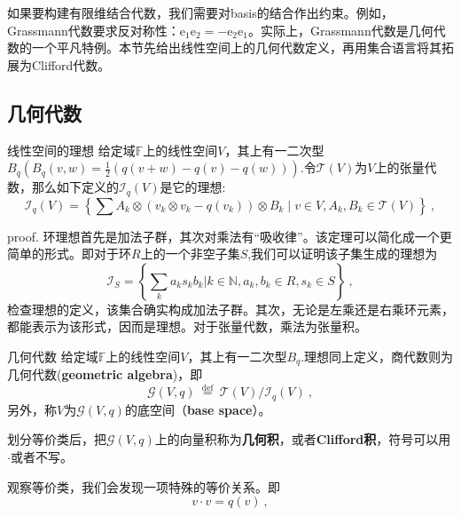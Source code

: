 
\begin{issues}
\issueTODO
\end{issues}

如果要构建有限维结合代数，我们需要对basis的结合作出约束。例如，Grassmann代数要求反对称性：$\mathrm {e_1e_2}=-\mathrm {e_2e_1}$。实际上，Grassmann代数是几何代数的一个平凡特例。本节先给出线性空间上的几何代数定义，再用集合语言将其拓展为Clifford代数。
\subsection{几何代数}
\begin{theorem}{线性空间的理想}
给定域$\mathbb F$上的线性空间$V$，其上有一二次型$B_q(B_q(v,w)=\frac{1}{2}(q(v+w)-q(v)-q(w)))$.令$\mathcal T(V)$为$V$上的张量代数，那么如下定义的$\mathcal {I}_q(V)$是它的理想:
\begin{equation}
\mathcal{I}_{q}(V)=\left\{\sum A_{k} \otimes(v_k \otimes v_k-q(v_k)) \otimes B_{k} \mid v \in V, A_{k}, B_{k} \in \mathcal{T}(V)\right\}~,
\end{equation}
\end{theorem}
proof.
环理想首先是加法子群，其次对乘法有“吸收律”。该定理可以简化成一个更简单的形式。即对于环$R$上的一个非空子集$S$,我们可以证明该子集生成的理想为
\begin{equation}
\mathcal {I}_S=\left\{\sum _k a_k s_kb_k|k\in \mathbb N ,a_k,b_k\in R,s_k\in S\right\}~,
\end{equation}
检查理想的定义，该集合确实构成加法子群。其次，无论是左乘还是右乘环元素，都能表示为该形式，因而是理想。对于张量代数，乘法为张量积。

\begin{definition}{几何代数}
给定域$\mathbb F$上的线性空间$V$，其上有一二次型$B_q$.理想同上定义，商代数则为几何代数(\textbf{geometric algebra})，即
\begin{equation}
\mathcal{G}(V, q) \stackrel{\text { def }}{=} \mathcal{T}(V) / \mathcal{I}_{q}(V)~,
\end{equation}
另外，称$V$为$\mathcal{G}(V, q)$的底空间（\textbf{base space}）。
\end{definition}
划分等价类后，把$\mathcal{G}(V, q)$上的向量积称为\textbf{几何积}，或者\textbf{Clifford积}，符号可以用$\cdot$或者不写。

观察等价类，我们会发现一项特殊的等价关系。即
\begin{equation}
v\cdot v=q(v)~,
\end{equation}

